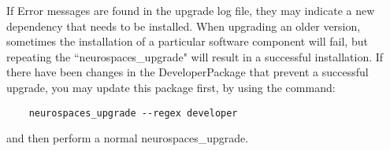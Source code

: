 \documentclass[12pt]{article}
\begin{document}
If Error messages are found in the upgrade log file, they may indicate a
new dependency that needs to be installed.  When upgrading an older
version, sometimes the installation of a particular software component
will fail, but repeating the ``neurospaces\_upgrade" will result in
a successful installation.  If there have been changes in the
DeveloperPackage that prevent a successful upgrade, you may update
this package first, by using the command:

\begin{verbatim}
    neurospaces_upgrade --regex developer
\end{verbatim}

and then perform a normal neurospaces\_upgrade.
 
\end{document}
